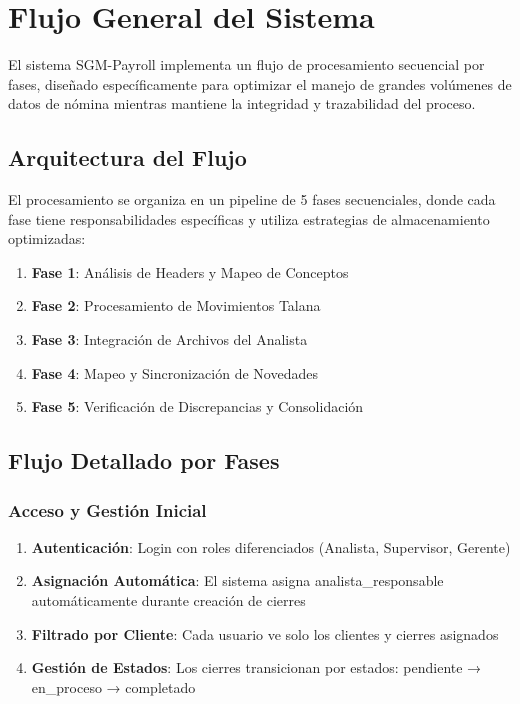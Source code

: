 
\section{Flujo General del Sistema}

El sistema SGM-Payroll implementa un flujo de procesamiento secuencial por fases, diseñado específicamente para optimizar el manejo de grandes volúmenes de datos de nómina mientras mantiene la integridad y trazabilidad del proceso.

\subsection{Arquitectura del Flujo}

El procesamiento se organiza en un pipeline de 5 fases secuenciales, donde cada fase tiene responsabilidades específicas y utiliza estrategias de almacenamiento optimizadas:

\begin{enumerate}
    \item \textbf{Fase 1}: Análisis de Headers y Mapeo de Conceptos
    \item \textbf{Fase 2}: Procesamiento de Movimientos Talana  
    \item \textbf{Fase 3}: Integración de Archivos del Analista
    \item \textbf{Fase 4}: Mapeo y Sincronización de Novedades
    \item \textbf{Fase 5}: Verificación de Discrepancias y Consolidación
\end{enumerate}

\subsection{Flujo Detallado por Fases}

\subsubsection{Acceso y Gestión Inicial}

\begin{enumerate}
    \item \textbf{Autenticación}: Login con roles diferenciados (Analista, Supervisor, Gerente)
    \item \textbf{Asignación Automática}: El sistema asigna analista\_responsable automáticamente durante creación de cierres
    \item \textbf{Filtrado por Cliente}: Cada usuario ve solo los clientes y cierres asignados
    \item \textbf{Gestión de Estados}: Los cierres transicionan por estados: pendiente → en\_proceso → completado
\end{enumerate}

